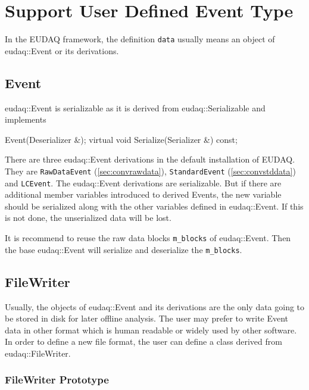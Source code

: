 \section{Support User Defined Event Type}\label{sec:NewDataHandling}
In the EUDAQ framework, the definition \texttt{data} usually means an object of eudaq::Event or its derivations. 

\subsection{Event}
eudaq::Event is serializable as it is derived from eudaq::Serializable and implements
\begin{listing}
  Event(Deserializer &);
  virtual void Serialize(Serializer &) const;    
\end{listing}

There are three eudaq::Event derivations in the default installation of EUDAQ. They are \lstinline[style=cpp]{RawDataEvent} (\autoref{sec:convrawdata}), \lstinline[style=cpp]{StandardEvent} (\autoref{sec:convstddata}) and \lstinline[style=cpp]{LCEvent}. The eudaq::Event derivations are serializable. But if there are additional member variables introduced to derived Events, the new variable should be serialized along with the other variables defined in eudaq::Event. If this is not done, the unserialized data will be lost.

It is recommend to reuse the raw data blocks \lstinline[style=cpp]{m_blocks} of eudaq::Event. Then the base eudaq::Event will serialize and deserialize the \lstinline[style=cpp]{m_blocks}.\\

\subsection{FileWriter}\label{sec:FileWriterWriting}
Usually, the objects of eudaq::Event and its derivations are the only data going to be stored in disk for later offline analysis. The user may prefer to write Event data in other format which is human readable or widely used by other software. In order to define a new file format, the user can define a class derived from eudaq::FileWriter.


\subsubsection{FileWriter Prototype}


